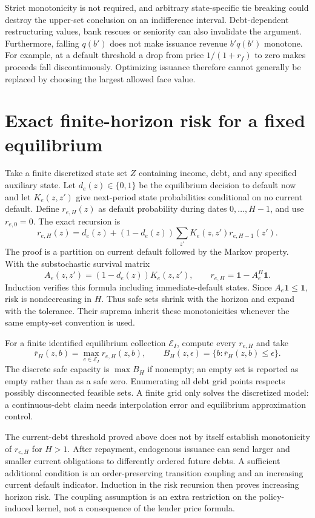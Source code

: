 \documentclass[11pt]{article}
\begin{document}
Strict monotonicity is not required, and arbitrary state-specific tie breaking could destroy the upper-set conclusion on an indifference interval. Debt-dependent restructuring values, bank rescues or seniority can also invalidate the argument. Furthermore, falling $q(b')$ does not make issuance revenue $b'q(b')$ monotone. For example, at a default threshold a drop from price $1/(1+r_f)$ to zero makes proceeds fall discontinuously. Optimizing issuance therefore cannot generally be replaced by choosing the largest allowed face value.

\section*{Exact finite-horizon risk for a fixed equilibrium}
Take a finite discretized state set $Z$ containing income, debt, and any specified auxiliary state. Let $d_e(z)\in\{0,1\}$ be the equilibrium decision to default now and let $K_e(z,z')$ give next-period state probabilities conditional on no current default. Define $r_{e,H}(z)$ as default probability during dates $0,\ldots,H-1$, and use $r_{e,0}=0$. The exact recursion is
\[
 r_{e,H}(z)=d_e(z)+(1-d_e(z))\sum_{z'}K_e(z,z')r_{e,H-1}(z').
\]
The proof is a partition on current default followed by the Markov property. With the substochastic survival matrix
\[
 A_e(z,z')=(1-d_e(z))K_e(z,z'),
 \qquad r_{e,H}=\mathbf1-A_e^H\mathbf1.
\]
Induction verifies this formula including immediate-default states. Since $A_e\mathbf1\leq\mathbf1$, risk is nondecreasing in $H$. Thus safe sets shrink with the horizon and expand with the tolerance. Their suprema inherit these monotonicities whenever the same empty-set convention is used.

For a finite identified equilibrium collection $\mathcal E_I$, compute every $r_{e,H}$ and take
\[
 \overline r_H(z,b)=\max_{e\in\mathcal E_I}r_{e,H}(z,b),\qquad
 B_H(z,\epsilon)=\{b:\overline r_H(z,b)\leq\epsilon\}.
\]
The discrete safe capacity is $\max B_H$ if nonempty; an empty set is reported as empty rather than as a safe zero. Enumerating all debt grid points respects possibly disconnected feasible sets. A finite grid only solves the discretized model: a continuous-debt claim needs interpolation error and equilibrium approximation control.

The current-debt threshold proved above does not by itself establish monotonicity of $r_{e,H}$ for $H>1$. After repayment, endogenous issuance can send larger and smaller current obligations to differently ordered future debts. A sufficient additional condition is an order-preserving transition coupling and an increasing current default indicator. Induction in the risk recursion then proves increasing horizon risk. The coupling assumption is an extra restriction on the policy-induced kernel, not a consequence of the lender price formula.
\end{document}
